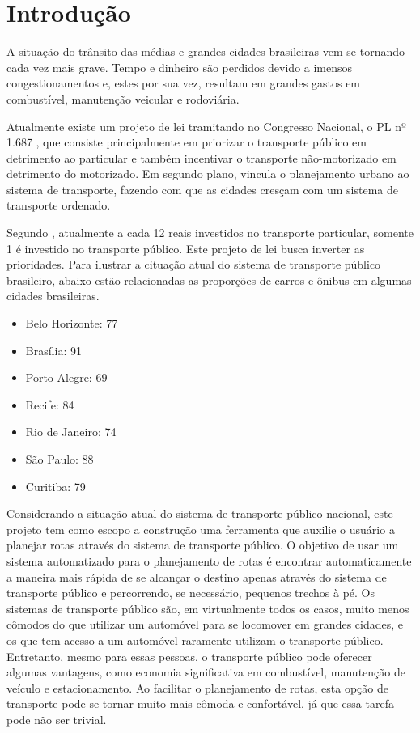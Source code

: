 \chapter{Introdução}
A situação do trânsito das médias e grandes cidades brasileiras vem se tornando cada vez mais grave.
Tempo e dinheiro são perdidos devido a imensos congestionamentos e, estes por sua vez, resultam em grandes gastos em combustível, manutenção veicular e rodoviária.

Atualmente existe um projeto de lei tramitando no Congresso Nacional, o PL nº 1.687 \cite{FlexaRibeiro2010}, que consiste principalmente em priorizar o transporte público em detrimento ao particular e também incentivar o transporte não-motorizado em detrimento do motorizado.
Em segundo plano, vincula o planejamento urbano ao sistema de transporte, fazendo com que as cidades cresçam com um sistema de transporte ordenado.

Segundo \cite{IPEA2011}, atualmente a cada 12 reais investidos no transporte particular, somente 1 é investido no transporte público.
Este projeto de lei busca inverter as prioridades.
Para ilustrar a cituação atual do sistema de transporte público brasileiro, abaixo estão relacionadas as proporções de carros e ônibus em algumas cidades brasileiras.
\begin{itemize}
    \item Belo Horizonte: 77%
    \item Brasília: 91%
    \item Porto Alegre: 69%
    \item Recife: 84%
    \item Rio de Janeiro: 74%
    \item São Paulo: 88%
    \item Curitiba: 79%
\end{itemize}

Considerando a situação atual do sistema de transporte público nacional, este projeto tem como escopo a construção uma ferramenta que auxilie o usuário a planejar rotas através do sistema de transporte público.
O objetivo de usar um sistema automatizado para o planejamento de rotas é encontrar automaticamente a maneira mais rápida de se alcançar o destino apenas através do sistema de transporte público e percorrendo, se necessário, pequenos trechos à pé.
Os sistemas de transporte público são, em virtualmente todos os casos, muito menos cômodos do que utilizar um automóvel para se locomover em grandes cidades, e os que tem acesso a um automóvel raramente utilizam o transporte público. Entretanto, mesmo para essas pessoas, o transporte público pode oferecer algumas vantagens, como economia significativa em combustível, manutenção de veículo e estacionamento. Ao facilitar o planejamento de rotas, esta opção de transporte pode se tornar muito mais cômoda e confortável, já que essa tarefa pode não ser trivial.

